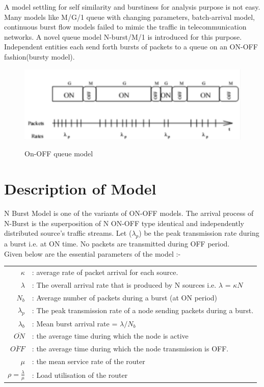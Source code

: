 A model settling for  self similarity and burstiness for analysis purpose is not easy. Many models like  M/G/1 queue with changing parameters, batch-arrival model, continuous burst flow models failed to mimic the traffic in telecommunication networks.
A novel queue model N-burst/M/1 is introduced for this purpose.
Independent entities each send forth bursts of packets to a queue on an ON-OFF fashion(bursty model).

\begin{figure}[ht!]
        \centering
        \includegraphics[scale=1]{on-off.PNG}
        \\\caption{On-OFF queue model}
        \label{on-off}
\end{figure}
\section{Description of Model}

N Burst Model is one of the variants of ON-OFF models. The arrival process of N-Burst is the superposition of N ON-OFF type identical and independently distributed source’s traffic streams.
Let (${\lambda}_p$) be the peak transmission rate during a burst i.e. at ON time. No packets are transmitted during OFF period.\\

Given below are the essential parameters of the model :-\\

 \begin{tabular}{rl}
$\kappa$ &:  average rate of packet arrival for each source.\\
$\lambda$ &: The overall arrival rate that is produced by N sources i.e. $\lambda$ =  ${\kappa}N$\\
$N_{b}$ &: Average number of packets during a burst (at ON period)\\
${\lambda}_p$ &:  The peak transmission rate of a node sending packets during a burst. \\
${\lambda}_b$ &: Mean burst arrival rate = $\lambda/N_{b}$\\
$\overline{ON}$ &: the average time during which the node is active\\
$\overline{OFF}$ &: the average time during which the node transmission is OFF.\\
$\mu$ & : the mean service rate of the router\\
$\rho = \frac{\lambda}{\mu}$ &: Load utilisation of the router \\
 \end{tabular}


